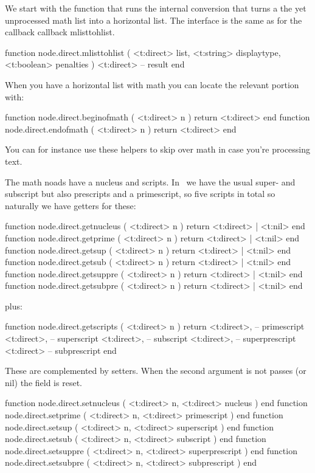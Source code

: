 \stopsubsection

\startsubsection[title={Math}]

We start with the function that runs the internal 
conversion that turns a the yet unprocessed math list into a horizontal list. The
interface is the same as for the callback callback {mlisttohlist}.

\starttyping[option=LUA]
function node.direct.mlisttohlist (
    <t:direct>  list,
    <t:string>  displaytype,
    <t:boolean> penalties
)
   <t:direct> -- result
end
\stoptyping

When you have a horizontal list with math you can locate the relevant portion
with:

\starttyping[option=LUA]
function node.direct.beginofmath ( <t:direct> n ) return <t:direct> end
function node.direct.endofmath   ( <t:direct> n ) return <t:direct> end
\stoptyping

You can for instance use these helpers to skip over math in case you're
processing text.

The math noads have a nucleus and scripts. In \LUAMETATEX\ we have the usual
super- and subscript but also prescripts and a primescript, so five scripts in
total so naturally we have getters for these:

\starttyping[option=LUA]
function node.direct.getnucleus ( <t:direct> n ) return <t:direct> | <t:nil> end
function node.direct.getprime   ( <t:direct> n ) return <t:direct> | <t:nil> end
function node.direct.getsup     ( <t:direct> n ) return <t:direct> | <t:nil> end
function node.direct.getsub     ( <t:direct> n ) return <t:direct> | <t:nil> end
function node.direct.getsuppre  ( <t:direct> n ) return <t:direct> | <t:nil> end
function node.direct.getsubpre  ( <t:direct> n ) return <t:direct> | <t:nil> end
\stoptyping

plus:

\starttyping[option=LUA]
function node.direct.getscripts ( <t:direct> n )
    return
        <t:direct>, -- primescript
        <t:direct>, -- superscript
        <t:direct>, -- subscript
        <t:direct>, -- superprescript
        <t:direct>  -- subprescript
end
\stoptyping

These are complemented by setters. When the second argument is not passes (or nil)
the field is reset.

\starttyping[option=LUA]
function node.direct.setnucleus ( <t:direct> n, <t:direct> nucleus        ) end
function node.direct.setprime   ( <t:direct> n, <t:direct> primescript    ) end
function node.direct.setsup     ( <t:direct> n, <t:direct> superscript    ) end
function node.direct.setsub     ( <t:direct> n, <t:direct> subscript      ) end
function node.direct.setsuppre  ( <t:direct> n, <t:direct> superprescript ) end
function node.direct.setsubpre  ( <t:direct> n, <t:direct> subprescript   ) end
\stoptyping

